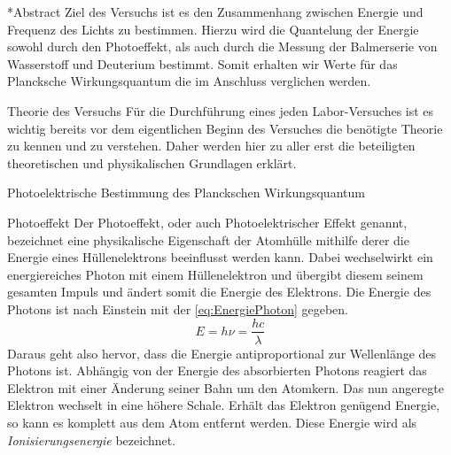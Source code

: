 \documentclass[pdftex, a4paper,11pt, twoside, ngerman]{report}
\begin{document}
  
  
  \begin{chapter}*{Abstract}
    Ziel des Versuchs ist es den Zusammenhang zwischen Energie und Frequenz des Lichts zu bestimmen. Hierzu wird die Quantelung der Energie sowohl durch den Photoeffekt, als auch durch die Messung der Balmerserie von Wasserstoff und Deuterium bestimmt. Somit erhalten wir Werte für das Plancksche Wirkungsquantum die im Anschluss verglichen werden. 
  \end{chapter}
  
  \tableofcontents
  
  
  
  \begin{chapter}{Theorie des Versuchs}
    \label{chp:Theorie}
    Für die Durchführung eines jeden Labor-Versuches ist es wichtig bereits vor dem eigentlichen Beginn des Versuches die benötigte Theorie zu kennen und zu verstehen. Daher werden hier zu aller erst die beteiligten theoretischen und physikalischen Grundlagen erklärt.
    
    
    
    \begin{section}{Photoelektrische Bestimmung des Planckschen Wirkungsquantum}
      \label{chp:TheoriePhotoelektrischesWirkungsquantum}
      
      
      
      
      \begin{subsection}{Photoeffekt}
        \label{chp:TheoriePhotoelektrischesWirkungsquantumPhotoeffekt}
        Der Photoeffekt, oder auch Photoelektrischer Effekt genannt, bezeichnet eine physikalische Eigenschaft der Atomhülle mithilfe derer die Energie eines Hüllenelektrons beeinflusst werden kann. Dabei wechselwirkt ein energiereiches Photon mit einem Hüllenelektron und übergibt diesem seinem gesamten Impuls und ändert somit die Energie des Elektrons. Die Energie des Photons ist nach Einstein mit der \cref{eq:EnergiePhoton} gegeben.
        \begin{equation}
          \label{eq:EnergiePhoton}
          E=h\nu=\frac{hc}{\lambda}
        \end{equation}
        Daraus geht also hervor, dass die Energie antiproportional zur Wellenlänge des Photons ist. Abhängig von der Energie des absorbierten Photons reagiert das Elektron mit einer Änderung seiner Bahn um den Atomkern. Das nun angeregte Elektron wechselt in eine höhere Schale. Erhält das Elektron genügend Energie, so kann es komplett aus dem Atom entfernt werden. Diese Energie wird als \textit{Ionisierungsenergie} bezeichnet.
        

\end{subsection}
\end{section}
\end{chapter}
\end{document}
